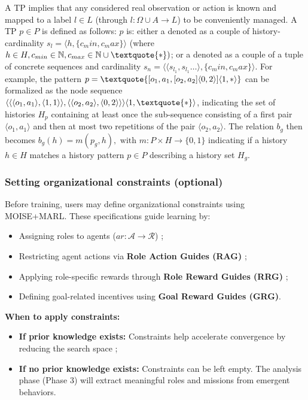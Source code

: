 \documentclass[pdflatex,sn-mathphys-num]{sn-jnl}%
\theoremstyle{thmstyleone}%
\theoremstyle{thmstyletwo}%
\theoremstyle{thmstylethree}%
\begin{document}
A TP implies that any considered real observation or action is known and mapped to a label $l \in L$ (through $l: \Omega \cup A \to L$) to be conveniently managed. A TP $p \in P$ is defined as follows: $p$ is: either a  denoted as a couple of history-cardinality $s_l = \langle h, \{c_min,c_max\}\rangle$ (where $h \in H, c_{min} \in \mathbb{N}, c_{max} \in \mathbb{N} \cup \textquote{*})$; or a  denoted as a couple of a tuple of concrete sequences and cardinality $s_n = \langle \langle s_{l_1}, s_{l_1}\dots \rangle, \{c_min,c_max\}\rangle$. For example, the pattern $p = \allowbreak \textquote{[o_1,a_1,[o_2,a_2]\langle0,2\rangle]\langle1,*\rangle}$ can be formalized as the node sequence $\allowbreak \langle \langle \langle o_1,a_1\rangle,\langle 1,1 \rangle \rangle, \langle \langle o_2,a_2 \rangle, \langle 0,2 \rangle \rangle \rangle \langle 1,\textquote{*} \rangle$, indicating the set of histories $H_p$ containing at least once the sub-sequence consisting of a first pair $\langle o_1,a_1\rangle$ and then at most two repetitions of the pair $\langle o_2,a_2 \rangle$.
The relation $b_g$ then becomes $b_g(h) = m(p_g,h), \text{ with } m: P \times H \to \{0,1\}$ indicating if a history $h \in H$ matches a history pattern $p \in P$ describing a history set $H_g$.

\subsubsection{Setting organizational constraints (optional)}
Before training, users may define organizational constraints using MOISE+MARL. These specifications guide learning by:
\begin{itemize}
    \item Assigning roles to agents ($ar: \mathcal{A} \to \mathcal{R}$) ;
    \item Restricting agent actions via \textbf{Role Action Guides (RAG)} ;
    \item Applying role-specific rewards through \textbf{Role Reward Guides (RRG)} ;
    \item Defining goal-related incentives using \textbf{Goal Reward Guides (GRG)}.
\end{itemize}

\noindent \textbf{When to apply constraints:}
\begin{itemize}
    \item \textbf{If prior knowledge exists:} Constraints help accelerate convergence by reducing the search space ;
    \item \textbf{If no prior knowledge exists:} Constraints can be left empty. The analysis phase (Phase 3) will extract meaningful roles and missions from emergent behaviors.
\end{itemize}
\end{document}
